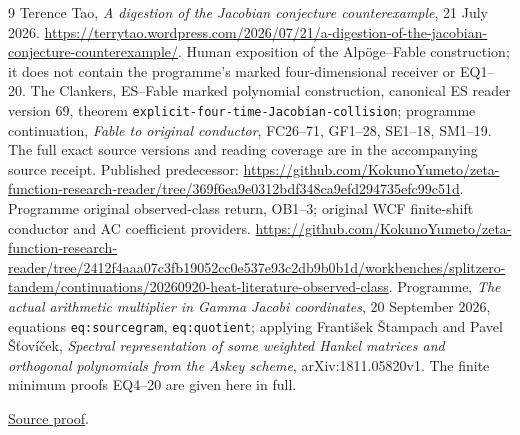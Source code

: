 \documentclass[11pt]{article}
\begin{document}
\begin{thebibliography}{9}
 Terence Tao, \emph{A digestion of the Jacobian conjecture
counterexample}, 21 July 2026.
\url{https://terrytao.wordpress.com/2026/07/21/a-digestion-of-the-jacobian-conjecture-counterexample/}.
Human exposition of the Alp\"oge--Fable construction; it does not
contain the programme's marked four-dimensional receiver or EQ1--20.
 The Clankers, ES--Fable marked polynomial construction,
canonical ES reader version 69, theorem
\texttt{explicit-four-time-Jacobian-collision}; programme continuation,
\emph{Fable to original conductor}, FC26--71, GF1--28, SE1--18,
SM1--19. The full exact source versions and reading coverage are in
the accompanying source receipt. Published predecessor:
\url{https://github.com/KokunoYumeto/zeta-function-research-reader/tree/369f6ea9e0312bdf348ca9efd294735efc99c51d}.
 Programme original observed-class return, OB1--3;
original WCF finite-shift conductor and AC coefficient providers.
\url{https://github.com/KokunoYumeto/zeta-function-research-reader/tree/2412f4aaa07c3fb19052cc0e537e93c2db9b0b1d/workbenches/splitzero-tandem/continuations/20260920-heat-literature-observed-class}.
 Programme, \emph{The actual arithmetic multiplier in
Gamma Jacobi coordinates}, 20 September 2026, equations
\texttt{eq:sourcegram}, \texttt{eq:quotient}; applying
Franti\v{s}ek \v{S}tampach and Pavel \v{S}\v{t}ov\'{i}\v{c}ek,
\emph{Spectral representation of some weighted Hankel matrices and
orthogonal polynomials from the Askey scheme}, arXiv:1811.05820v1.
The finite minimum proofs EQ4--20 are given here in full.

\href{https://github.com/KokunoYumeto/zeta-function-research-reader/blob/5992ad50c0f2a06921f1fcaded7b4e38097c0739/workbenches/splitzero-tandem/continuations/20260920-original-kernel-mixed-determinants/providers/NATIVE_JACOBI_COMMUTANT.tex\#L1}{Source proof}.
\end{thebibliography}
\end{document}
